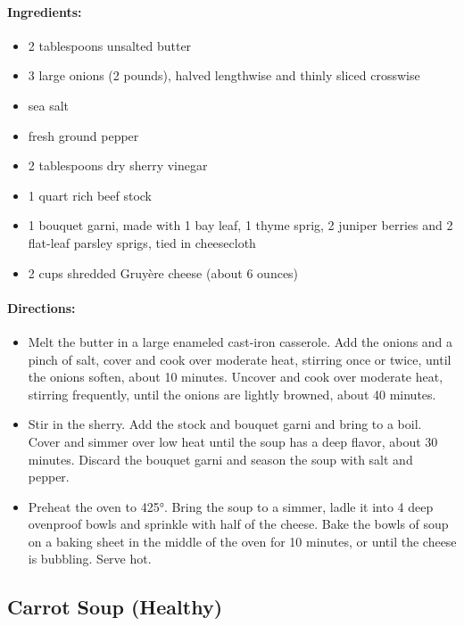 \documentclass{article}
\begin{document}
\paragraph{Ingredients:}
\begin{itemize}
    \item 2 tablespoons unsalted butter
    \item 3 large onions (2 pounds), halved lengthwise and thinly sliced crosswise
    \item sea salt
    \item fresh ground pepper
    \item 2 tablespoons dry sherry vinegar
    \item 1 quart rich beef stock
    \item 1 bouquet garni, made with 1 bay leaf, 1 thyme sprig, 2 juniper berries and 2 flat-leaf parsley sprigs, tied in cheesecloth
    \item 2 cups shredded Gruyère cheese (about 6 ounces)
\end{itemize}

\paragraph{Directions:}
\begin{itemize}
    \item Melt the butter in a large enameled cast-iron casserole. Add the onions and a pinch of salt, cover and cook over moderate heat, stirring once or twice, until the onions soften, about 10 minutes. Uncover and cook over moderate heat, stirring frequently, until the onions are lightly browned, about 40 minutes.
    \item Stir in the sherry. Add the stock and bouquet garni and bring to a boil. Cover and simmer over low heat until the soup has a deep flavor, about 30 minutes. Discard the bouquet garni and season the soup with salt and pepper.
    \item Preheat the oven to 425°. Bring the soup to a simmer, ladle it into 4 deep ovenproof bowls and sprinkle with half of the cheese. Bake the bowls of soup on a baking sheet in the middle of the oven for 10 minutes, or until the cheese is bubbling. Serve hot.
\end{itemize}

\subsection{Carrot Soup (Healthy)}
\end{document}
